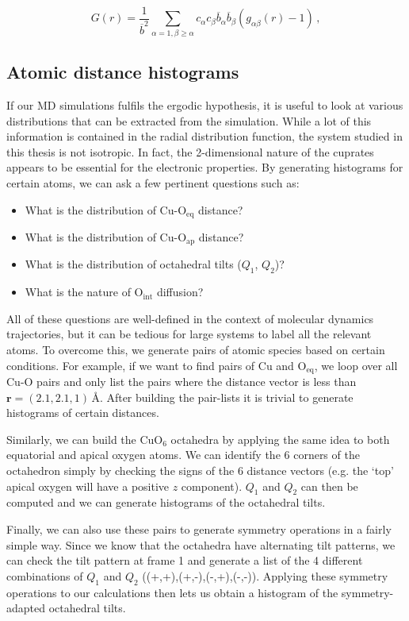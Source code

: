 \[ G(r) = \frac{1}{\overline{b}^2} \sum_{\alpha=1,\beta\geq\alpha} c_\alpha c_\beta \overline{b}_\alpha \overline{b}_\beta (g_{\alpha\beta}(r) - 1) \, , \]

\subsection{Atomic distance histograms}
If our MD simulations fulfils the ergodic hypothesis, it is useful to look at various distributions that can be extracted from the simulation. While a lot of this information is contained in the radial distribution function, the system studied in this thesis is not isotropic. In fact, the 2-dimensional nature of the cuprates appears to be essential for the electronic properties. By generating histograms for certain atoms, we can ask a few pertinent questions such as:
%
\begin{itemize}
	\item What is the distribution of Cu-O$_\text{eq}$ distance?
	\item What is the distribution of Cu-O$_\text{ap}$ distance?
	\item What is the distribution of octahedral tilts ($Q_1$, $Q_2$)?
	\item What is the nature of O$_\text{int}$ diffusion?
\end{itemize}
%
All of these questions are well-defined in the context of molecular dynamics trajectories, but it can be tedious for large systems to label all the relevant atoms. To overcome this, we generate pairs of atomic species based on certain conditions. For example, if we want to find pairs of Cu and O$_\text{eq}$, we loop over all Cu-O pairs and only list the pairs where the distance vector is less than $\bm{r} = (2.1, 2.1, 1)\,\si{\angstrom}$. After building the pair-lists it is trivial to generate histograms of certain distances.

Similarly, we can build the CuO$_6$ octahedra by applying the same idea to both equatorial and apical oxygen atoms. We can identify the 6 corners of the octahedron simply by checking the signs of the 6 distance vectors (e.g. the `top' apical oxygen will have a positive $z$ component). $Q_1$ and $Q_2$ can then be computed and we can generate histograms of the octahedral tilts.

Finally, we can also use these pairs to generate symmetry operations in a fairly simple way. Since we know that the octahedra have alternating tilt patterns, we can check the tilt pattern at frame 1 and generate a list of the 4 different combinations of $Q_1$ and $Q_2$ ((+,+),(+,-),(-,+),(-,-)). Applying these symmetry operations to our calculations then lets us obtain a histogram of the symmetry-adapted octahedral tilts.

